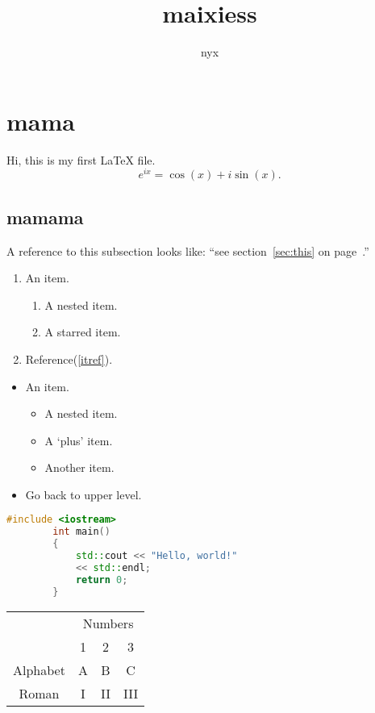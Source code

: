 \documentclass{article}
\begin{document}
	\title{maixiess}
	\author{nyx}
	\maketitle
	\newpage
	\tableofcontents
	\newpage
	
	\section{mama}
		Hi, this is my first \LaTeX{} file.
		$$ e^{ix}=\cos(x)+i\sin(x). $$
	\subsection*{mamama}
	A reference to this subsection\label{sec:this} looks like:
	``see section~\ref{sec:this} on page~\pageref{sec:this}.''
	\begin{enumerate}
		\item An item.
		\begin{enumerate}
			\item A nested item.\label{itref}
			\item A starred item.
		\end{enumerate}
		\item Reference(\ref{itref}).
	\end{enumerate}
	\begin{itemize}
		\item An item.
		\begin{itemize}
			\item A nested item.
			\item A `plus' item.
			\item Another item.
		\end{itemize}
		\item Go back to upper level.
	\end{itemize}
	\begin{lstlisting}[language=c++]
		#include <iostream>
		int main()
		{
			std::cout << "Hello, world!"
			<< std::endl;
			return 0;
		}
	\end{lstlisting}
	\begin{tabular}{cccc}
		\toprule
		& \multicolumn{3}{c}{Numbers} \\
		\cmidrule{2-4}
		& 1 & 2 & 3 \\
		\midrule
		Alphabet & A & B & C \\
		Roman & I & II& III \\
		\bottomrule
	\end{tabular}
\end{document}
